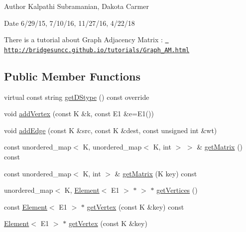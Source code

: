 \begin{DoxyAuthor}{Author}
Kalpathi Subramanian, Dakota Carmer 
\end{DoxyAuthor}
\begin{DoxyDate}{Date}
6/29/15, 7/10/16, 11/27/16, 4/22/18
\end{DoxyDate}
There is a tutorial about Graph Adjacency Matrix \+: \href{http://bridgesuncc.github.io/tutorials/Graph_AM.html}{\texttt{ http\+://bridgesuncc.\+github.\+io/tutorials/\+Graph\+\_\+\+A\+M.\+html}} \subsection*{Public Member Functions}
\begin{DoxyCompactItemize}
\item 
virtual const string \mbox{\hyperlink{classbridges_1_1datastructure_1_1_graph_adj_matrix_a2f8c67da1078354156fc646097152c6d}{get\+D\+Stype}} () const override
\item 
void \mbox{\hyperlink{classbridges_1_1datastructure_1_1_graph_adj_matrix_aaebb2607d06b1c36548652dba0211744}{add\+Vertex}} (const K \&k, const E1 \&e=E1())
\item 
void \mbox{\hyperlink{classbridges_1_1datastructure_1_1_graph_adj_matrix_ab23870ac203b3784157ecb05443494a4}{add\+Edge}} (const K \&src, const K \&dest, const unsigned int \&wt)
\item 
const unordered\+\_\+map$<$ K, unordered\+\_\+map$<$ K, int $>$ $>$ \& \mbox{\hyperlink{classbridges_1_1datastructure_1_1_graph_adj_matrix_aaf5c1ae5267b7ff4c8fcc861221ff2e8}{get\+Matrix}} () const
\item 
const unordered\+\_\+map$<$ K, int $>$ \& \mbox{\hyperlink{classbridges_1_1datastructure_1_1_graph_adj_matrix_a0b49749793278a1910dd5ea67dbaeacf}{get\+Matrix}} (K key) const
\item 
unordered\+\_\+map$<$ K, \mbox{\hyperlink{classbridges_1_1datastructure_1_1_element}{Element}}$<$ E1 $>$ $\ast$ $>$ $\ast$ \mbox{\hyperlink{classbridges_1_1datastructure_1_1_graph_adj_matrix_a4bcf803c43af2f14224a0891b9260fbf}{get\+Vertices}} ()
\item 
const \mbox{\hyperlink{classbridges_1_1datastructure_1_1_element}{Element}}$<$ E1 $>$ $\ast$ \mbox{\hyperlink{classbridges_1_1datastructure_1_1_graph_adj_matrix_a3de2ef8ce16e0c0d2240a92838ffd8aa}{get\+Vertex}} (const K \&key) const
\item 
\mbox{\hyperlink{classbridges_1_1datastructure_1_1_element}{Element}}$<$ E1 $>$ $\ast$ \mbox{\hyperlink{classbridges_1_1datastructure_1_1_graph_adj_matrix_a4100f224c05a77dd2c362c05fa15e6a2}{get\+Vertex}} (const K \&key)

\end{DoxyCompactItemize}
